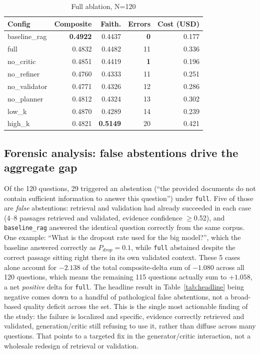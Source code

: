 \documentclass[conference]{IEEEtran}
\begin{document}
\begin{table}[t]
\centering
\caption{Full ablation, N=120}
\label{tab:ablation}
\begin{tabular}{lrrrr}
\toprule
Config & Composite & Faith. & Errors & Cost (USD) \\
\midrule
baseline\_rag & \textbf{0.4922} & 0.4437 & \textbf{0} & 0.177 \\
full & 0.4832 & 0.4482 & 11 & 0.336 \\
no\_critic & 0.4851 & 0.4419 & \textbf{1} & 0.196 \\
no\_refiner & 0.4760 & 0.4333 & 11 & 0.251 \\
no\_validator & 0.4771 & 0.4326 & 12 & 0.286 \\
no\_planner & 0.4812 & 0.4324 & 13 & 0.302 \\
low\_k & 0.4870 & 0.4289 & 14 & 0.239 \\
high\_k & 0.4821 & \textbf{0.5149} & 20 & 0.421 \\
\bottomrule
\end{tabular}
\end{table}

\subsection{Forensic analysis: false abstentions drive the aggregate gap}

Of the 120 questions, 29 triggered an abstention (``the provided documents do not
contain sufficient information to answer this question'') under \texttt{full}. Five of
those are \emph{false} abstentions: retrieval and validation had already succeeded in
each case (4--8 passages retrieved and validated, evidence confidence $\geq$0.52), and
\texttt{baseline\_rag} answered the identical question correctly from the same corpus.
One example: ``What is the dropout rate used for the big model?'', which the baseline
answered correctly as $P_{drop}=0.1$, while \texttt{full} abstained despite the correct
passage sitting right there in its own validated context. These 5 cases alone account
for $-2.138$ of the total composite-delta sum of $-1.080$ across all 120 questions,
which means the remaining 115 questions actually sum to $+1.058$, a net
\emph{positive} delta for \texttt{full}. The headline result in Table~\ref{tab:headline}
being negative comes down to a handful of pathological false abstentions, not a
broad-based quality deficit across the set. This is the single most actionable finding
of the study: the failure is localized and specific, evidence correctly retrieved and
validated, generation/critic still refusing to use it, rather than diffuse across many
questions. That points to a targeted fix in the generator/critic interaction, not a
wholesale redesign of retrieval or validation.
\end{document}
